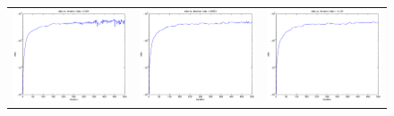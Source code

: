 \documentclass{article} %
\begin{document}
\begin{figure}
\begin{tabular}{ccc}
\includegraphics[scale=0.3]{figures/func3-svi-lrate1e-03-bound.eps} &
\includegraphics[scale=0.3]{figures/func3-svi-lrate1e-04-bound.eps} &
\includegraphics[scale=0.3]{figures/func3-svi-lrate1e-05-bound.eps} \\ 

\end{tabular}
\end{figure}
\end{document}
